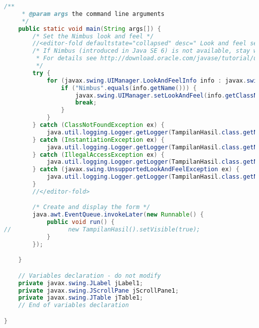 \begin{lstlisting}[language=Java, caption=TampilanHasil.java]
    /**
     * @param args the command line arguments
     */
    public static void main(String args[]) {
        /* Set the Nimbus look and feel */
        //<editor-fold defaultstate="collapsed" desc=" Look and feel setting code (optional) ">
        /* If Nimbus (introduced in Java SE 6) is not available, stay with the default look and feel.
         * For details see http://download.oracle.com/javase/tutorial/uiswing/lookandfeel/plaf.html 
         */
        try {
            for (javax.swing.UIManager.LookAndFeelInfo info : javax.swing.UIManager.getInstalledLookAndFeels()) {
                if ("Nimbus".equals(info.getName())) {
                    javax.swing.UIManager.setLookAndFeel(info.getClassName());
                    break;
                }
            }
        } catch (ClassNotFoundException ex) {
            java.util.logging.Logger.getLogger(TampilanHasil.class.getName()).log(java.util.logging.Level.SEVERE, null, ex);
        } catch (InstantiationException ex) {
            java.util.logging.Logger.getLogger(TampilanHasil.class.getName()).log(java.util.logging.Level.SEVERE, null, ex);
        } catch (IllegalAccessException ex) {
            java.util.logging.Logger.getLogger(TampilanHasil.class.getName()).log(java.util.logging.Level.SEVERE, null, ex);
        } catch (javax.swing.UnsupportedLookAndFeelException ex) {
            java.util.logging.Logger.getLogger(TampilanHasil.class.getName()).log(java.util.logging.Level.SEVERE, null, ex);
        }
        //</editor-fold>

        /* Create and display the form */
        java.awt.EventQueue.invokeLater(new Runnable() {
            public void run() {
//                new TampilanHasil().setVisible(true);
            }
        });

    }

    // Variables declaration - do not modify                     
    private javax.swing.JLabel jLabel1;
    private javax.swing.JScrollPane jScrollPane1;
    private javax.swing.JTable jTable1;
    // End of variables declaration                   

}

\end{lstlisting}
% 

